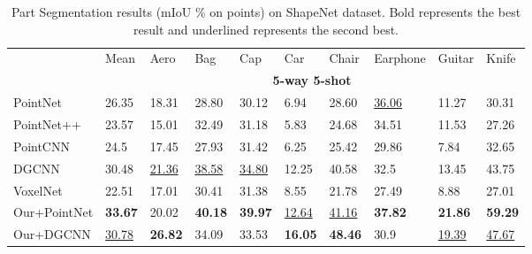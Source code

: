 \documentclass{article}
\begin{document}
\begin{table}[h]
  \caption{Part Segmentation results (mIoU \% on points) on ShapeNet dataset. Bold represents the best result and underlined represents the second best.}
  \label{part1}
  \centering
  \normalsize
  \setlength{\tabcolsep}{4.5pt}
  \begin{tabular}{llllllllll}
    \toprule
    
    &Mean&Aero&Bag&Cap&Car&Chair&Earphone&Guitar&Knife\\

    \cmidrule(r){2-10}
    & \multicolumn{9}{c}{\textbf{5-way 5-shot}}\\
    \cmidrule(r){2-10}
    PointNet & 26.35 & 18.31 & 28.80 & 30.12 & 6.94 &28.60 &\underline{36.06} &11.27 &30.31 \\ 
    PointNet++ &23.57 &15.01 &32.49 &31.18 &5.83 &24.68 &34.51 &11.53 &27.26 \\
    PointCNN &24.5 &17.45 &27.93 &31.42 &6.25 &25.42 &29.86 &7.84 &32.65 \\
    DGCNN & 30.48 & \underline{21.36}&\underline{38.58}&\underline{34.80}&12.25&40.58&32.5&13.45&43.75\\
    VoxelNet & 22.51 &17.01 &30.41 &31.38 &8.55 &21.78 &27.49 &8.88 &27.01 \\
    \midrule
    Our+PointNet &\textbf{33.67} &20.02&\textbf{40.18} &\textbf{39.97}&\underline{12.64} &\underline{41.16} &\textbf{37.82} &\textbf{21.86} &\textbf{59.29} \\
    Our+DGCNN & \underline{30.78} & \textbf{26.82}&34.09&33.53&\textbf{16.05}&\textbf{48.46}&30.9&\underline{19.39}&\underline{47.67}\\
    \bottomrule
  \end{tabular}
\end{table}
\end{document}
